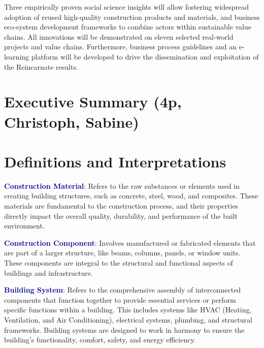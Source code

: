 Three empirically proven social science insights will allow fostering widespread adoption of reused high-quality construction products and materials, and business eco-system development frameworks to combine actors within sustainable value chains. All innovations will be demonstrated on eleven selected real-world projects and value chains. Furthermore, business process guidelines and an e-learning platform will be developed to drive the dissemination and exploitation of the Reincarnate results.
\newpage
\tableofcontents %

\newpage
\listoffigures %

\newpage
\listoftables %

\newpage
\section*{Executive Summary (4p, Christoph, Sabine)}


\section{Definitions and Interpretations}

\textbf{\textcolor{darkblue}{Construction Material}}: Refers to the raw substances or elements used in creating building structures, such as concrete, steel, wood, and composites. These materials are fundamental to the construction process, and their properties directly impact the overall quality, durability, and performance of the built environment.

\textbf{\textcolor{darkblue}{Construction Component}}: Involves manufactured or fabricated elements that are part of a larger structure, like beams, columns, panels, or window units. These components are integral to the structural and functional aspects of buildings and infrastructure.


\textbf{\textcolor{darkblue}{Building System}}:
Refers to the comprehensive assembly of interconnected components that function together to provide essential services or perform specific functions within a building. This includes systems like HVAC (Heating, Ventilation, and Air Conditioning), electrical systems, plumbing, and structural frameworks. Building systems are designed to work in harmony to ensure the building's functionality, comfort, safety, and energy efficiency.\\


